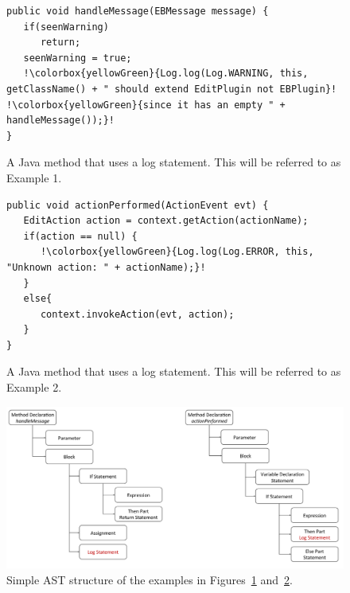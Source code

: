 \begin{figure}[p]
\def\baselinestretch{1}
\begin{lstlisting}[escapechar=!]
public void handleMessage(EBMessage message) {
   if(seenWarning)
      return;
   seenWarning = true;
   !\colorbox{yellowGreen}{Log.log(Log.WARNING, this, getClassName() + " should extend EditPlugin not EBPlugin}!  !\colorbox{yellowGreen}{since it has an empty " + handleMessage());}!
}
\end{lstlisting}
\caption[Example 1: A \protect{} method that uses a log statement.]{A Java method that uses a log statement. This will be referred to as Example 1.\label{ch3-ex1}}
\end{figure}

\begin{figure}[p]
\def\baselinestretch{1}
\begin{lstlisting}[escapechar=!]
public void actionPerformed(ActionEvent evt) {
   EditAction action = context.getAction(actionName);
   if(action == null) {
      !\colorbox{yellowGreen}{Log.log(Log.ERROR, this, "Unknown action: " + actionName);}!
   }
   else{
      context.invokeAction(evt, action);
   }
}
\end{lstlisting}
\caption[Example 2: A \protect{} method that uses a log statement.]{A Java method that uses a log statement. This will be referred to as Example 2.\label{ch3-ex2}}
\end{figure}

\begin{figure} [p]
  \centering\includegraphics[width = \textwidth]{Drawing4/AST.pdf}
  \caption{Simple AST structure of the examples in Figures~\ref{ch3-ex1} and~\ref{ch3-ex2}.}
  \label{fig:ast}
\end{figure}

